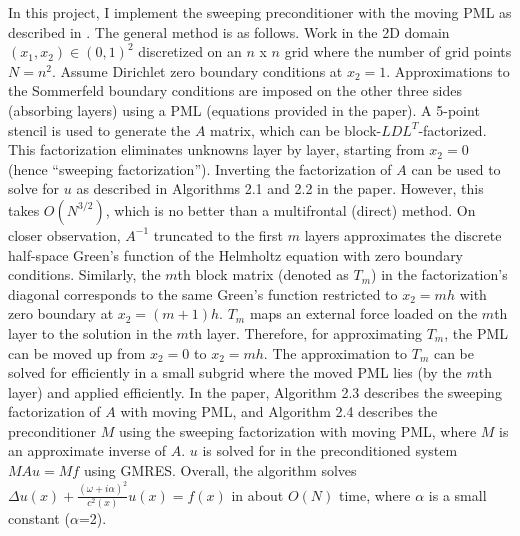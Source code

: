 \documentclass[11pt]{article}
\begin{document}
\iffalse
The frontal solver \cite{irons1970frontal} is a direct method for solving sparse 
systems in a manner similar to Gaussian elimination. The frontal solver extracts 
small blocks (fronts) within the sparse $A$ matrix for eliminating variables/equations. 
The multifrontal solver \cite{duff1983multifrontal} extends this method to process 
multiple independent fronts in parallel. For a 2D Helmholtz problem with $N=n^2$ unknowns, 
the multifrontal method takes $O(N^{3/2})$ time and $O(N \log N)$ space. The method 
becomes inefficient for 3D problems with $N=n^3$ unknowns, where it takes $O(N^2)$ 
time and $O(N^{4/3})$ space \cite{engquist2011matrix}. Direct methods also suffer 
from fill-in \cite{erlangga2008advances} that occurs during the Gaussian elimination process.
\fi

In this project, I implement the sweeping preconditioner with the moving PML as 
described in \cite{engquist2011pml}. The general method is as follows.
Work in the 2D domain $(x_1, x_2) \in (0,1)^2$ discretized on an $n$ x $n$ grid where the number 
of grid points $N=n^2$. 
Assume Dirichlet zero boundary conditions at $x_2=1$. Approximations to the Sommerfeld 
boundary conditions are imposed on the other three sides (absorbing layers) using a PML 
(equations provided in the paper).
A 5-point stencil is used to generate the $A$ matrix, which can be block-$LDL^T$-factorized. 
This factorization eliminates unknowns layer by layer, starting from $x_2=0$ (hence ``sweeping 
factorization''). 
Inverting the factorization of $A$ can be used to solve for $u$ as described in Algorithms 
2.1 and 2.2 in the paper. However, this takes $O(N^{3/2})$, which is no better than a 
multifrontal (direct) method. On closer observation, $A^{-1}$ truncated to the first $m$ layers 
approximates the discrete half-space Green's function of the Helmholtz equation with 
zero boundary conditions. Similarly, the $m$th block matrix (denoted as $T_m$) in the 
factorization's diagonal corresponds to the same Green's function restricted to $x_2=mh$
with zero boundary at $x_2=(m+1)h$. $T_m$ maps an external force loaded on the $m$th layer 
to the solution in the $m$th layer. Therefore, for approximating $T_m$, the PML can be 
moved up from $x_2=0$ to $x_2=mh$. The approximation to $T_m$ can be solved for efficiently
in a small subgrid where the moved PML lies (by the $m$th layer) and applied
efficiently. 
In the paper, Algorithm 2.3 describes the sweeping factorization of $A$ with moving PML, and 
Algorithm 2.4 describes the preconditioner $M$ using the sweeping factorization with moving PML, 
where $M$ is an approximate inverse of $A$. $u$ is solved for in the preconditioned system 
$MAu=Mf$ using GMRES.
Overall, the algorithm solves $\Delta u(x) + \frac{(\omega+i\alpha)^2}{c^2(x)}u(x)=f(x)$ in 
about $O(N)$ time, where $\alpha$ is a small constant ($\alpha$=2).
\end{document}

